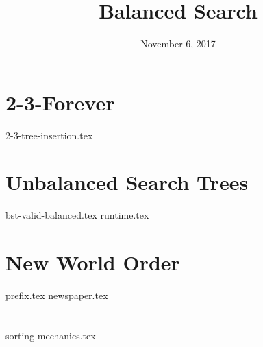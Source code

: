 \documentclass[11pt]{exam}
\title{Balanced Search}
\date{November 6, 2017}
\begin{document}
\maketitle

\section{2-3-Forever}
\begin{questions}
{2-3-tree-insertion.tex}
\end{questions}

\section{Unbalanced Search Trees}
\begin{questions}
{bst-valid-balanced.tex}
{runtime.tex}
\end{questions}

\section{New World Order}
\begin{questions}
{prefix.tex}
{newspaper.tex}
\end{questions}

\clearpage

\section{}
\begin{questions}
{sorting-mechanics.tex}
\end{questions}
\end{document}
